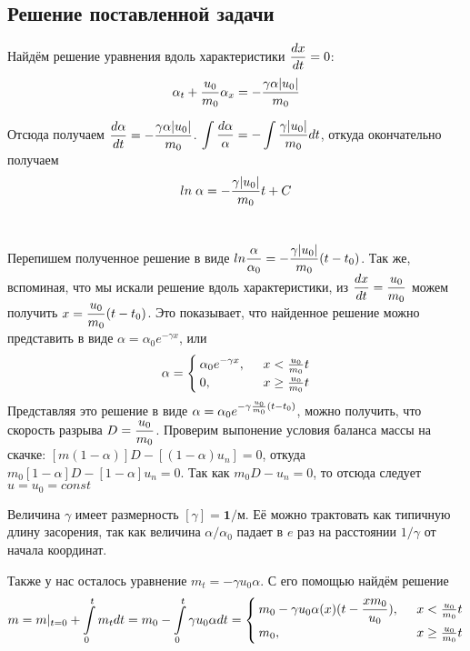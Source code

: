 \subsection{Решение поставленной задачи}
\par Найдём решение уравнения вдоль характеристики $\displaystyle \frac{dx}{dt}=0$: $$\displaystyle \alpha_{t}+\frac{u_{0}}{m_{0}}\alpha_{x}=-\frac{\gamma\alpha|u_{0}|}{m_{0}}$$ 
\par Отсюда получаем $\displaystyle \frac{d\alpha}{dt}=-\frac{\gamma\alpha|u_{0}|}{m_{0}}$. $\displaystyle \int\frac{d\alpha}{\alpha}=-\int\frac{\gamma|u_{0}|}{m_{0}}dt$, откуда окончательно получаем $$\displaystyle ln\;\alpha=-\frac{\gamma|u_{0}|}{m_{0}}t+C$$\\
\par Перепишем полученное решение в виде $\displaystyle ln\frac{\alpha}{\alpha_{0}}=-\frac{\gamma|u_{0}|}{m_{0}}(t-t_{0})$. Так же, вспоминая, что мы искали решение вдоль характеристики, из $\displaystyle \frac{dx}{dt}=\frac{u_{0}}{m_{0}}$ можем получить $\displaystyle x=\frac{u_{0}}{m_{0}}(t-t_{0})$. Это показывает, что найденное решение можно представить в виде $\alpha=\alpha_{0}e^{-\gamma x}$, или 
\begin{equation*}
\displaystyle
\alpha=
\begin{cases}
\displaystyle
\alpha_{0}e^{-\gamma x},\;\;& x<\frac{u_{0}}{m_{0}}t\\
0,\;\;& x\geq \frac{u_{0}}{m_{0}}t\\
\end{cases}
\end{equation*}
 Представляя это решение в виде $\displaystyle \alpha=\alpha_{0}e^{-\gamma \frac{u_{0}}{m_{0}}(t-t_{0})}$, можно получить, что скорость разрыва $\displaystyle D=\frac{u_{0}}{m_{0}}$. Проверим выпонение условия баланса массы на скачке: $[m(1-\alpha)]D-[(1-\alpha)u_{n}]=0$, откуда $m_{0}[1-\alpha]D-[1-\alpha]u_{n}=0$. Так как $m_{0}D-u_{n}=0$, то отсюда следует $u=u_{0}=const$\\
\par Величина $\gamma$ имеет размерность $[\gamma]=\textbf{1/м}$. Её можно трактовать как типичную длину засорения, так как величина $\alpha/\alpha_{0}$ падает в $e$ раз на расстоянии $1/\gamma$ от начала координат.\\
\par Также у нас осталось уравнение $m_{t}=-\gamma u_{0}\alpha$. С его помощью найдём решение 
\begin{equation*}
\displaystyle
m=m|_{t=0}+\int\limits^{t}_{0}m_{t}dt=m_{0}-\int\limits^{t}_{0}\gamma u_{0}\alpha dt=
\begin{cases}
\displaystyle
m_{0}-\gamma u_{0}\alpha(x)(t-\frac{xm_{0}}{u_{0}}),\;\;& x<\frac{u_{0}}{m_{0}}t\\
m_{0},\;\;& x\geq \frac{u_{0}}{m_{0}}t\\
\end{cases}
\end{equation*}